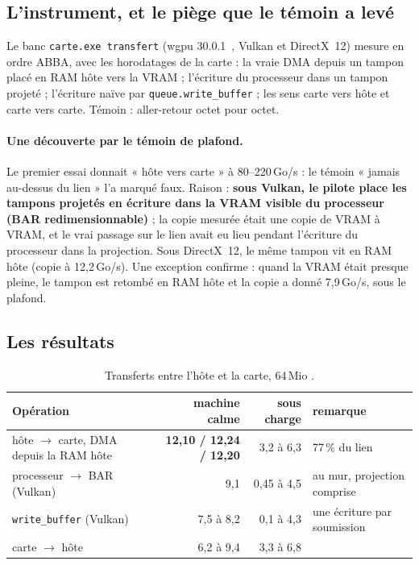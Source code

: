 \subsection{L'instrument, et le piège que le témoin a levé}

Le banc \texttt{carte.exe transfert} (wgpu 30.0.1~\cite{gfxrs2026wgpu}, Vulkan et DirectX~12) mesure en ordre ABBA, avec les horodatages de la carte : la vraie DMA depuis un tampon placé en RAM hôte vers la VRAM ; l'écriture du processeur dans un tampon projeté ; l'écriture naïve par \texttt{queue.write\_buffer} ; les sens carte vers hôte et carte vers carte. Témoin : aller-retour octet pour octet.

\paragraph{Une découverte par le témoin de plafond.} Le premier essai donnait « hôte vers carte » à 80--220\,Go/s : le témoin « jamais au-dessus du lien » l'a marqué faux. Raison : \textbf{sous Vulkan, le pilote place les tampons projetés en écriture dans la VRAM visible du processeur (BAR redimensionnable)} ; la copie mesurée était une copie de VRAM à VRAM, et le vrai passage sur le lien avait eu lieu pendant l'écriture du processeur dans la projection. Sous DirectX~12, le même tampon vit en RAM hôte (copie à 12,2\,Go/s). Une exception confirme : quand la VRAM était presque pleine, le tampon est retombé en RAM hôte et la copie a donné 7,9\,Go/s, sous le plafond.

\subsection{Les résultats}

\begin{table}[ht]
\centering\small
\caption[Transferts hôte $\leftrightarrow$ carte, 64\,Mio]{Transferts entre l'hôte et la carte, 64\,Mio \mes.}
\label{tab:pcie}
\begin{tabular}{@{}lrrl@{}}
\toprule
Opération & machine calme & sous charge & remarque \\
\midrule
hôte $\to$ carte, DMA depuis la RAM hôte & \textbf{12,10 / 12,24 / 12,20} & 3,2 à 6,3 & 77\,\% du lien \\
processeur $\to$ BAR (Vulkan) & 9,1 & 0,45 à 4,5 & au mur, projection comprise \\
\texttt{write\_buffer} (Vulkan) & 7,5 à 8,2 & 0,1 à 4,3 & une écriture par soumission \\
carte $\to$ hôte & 6,2 à 9,4 & 3,3 à 6,8 & \\
\bottomrule
\end{tabular}
\end{table}

